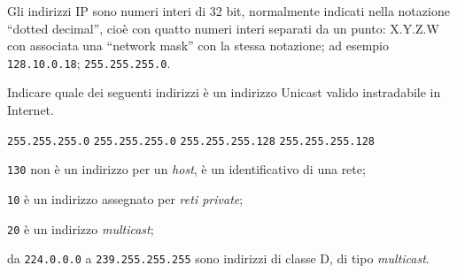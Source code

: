 \question
Gli indirizzi IP sono numeri interi di 32 bit, normalmente indicati nella notazione \enquote{dotted decimal}, cioè con quatto numeri interi separati da un punto: X.Y.Z.W con associata una \enquote{network mask} con la stessa notazione; ad esempio \texttt{128.10.0.18}; \texttt{255.255.255.0}.

Indicare quale dei seguenti indirizzi è un indirizzo Unicast valido instradabile in Internet.

\begin{checkboxes}
	\choice {} \texttt{255.255.255.0}
	\choice {} \texttt{255.255.255.0}
	\CorrectChoice {} \texttt{255.255.255.128}
	\choice {} \texttt{255.255.255.128}
\end{checkboxes}

\begin{solution}
\begin{compactlist}
		\item \texttt{130} non è un indirizzo per un \emph{host}, è un identificativo di una rete;
		\item \texttt{10} è un indirizzo assegnato per \emph{reti private};
		\item \texttt{20} è un indirizzo \emph{multicast};
		\item da \texttt{224.0.0.0} a \texttt{239.255.255.255} sono indirizzi di classe D, di tipo \emph{multicast}.
\end{compactlist}
\end{solution}
